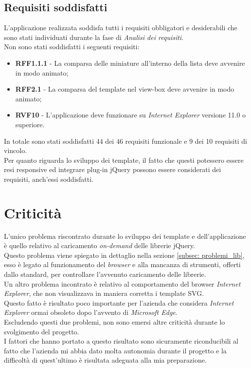 \subsection{Requisiti soddisfatti}
L'applicazione realizzata soddisfa tutti i requisiti obbligatori e desiderabili che sono stati individuati durante la fase di \textit{Analisi dei requisiti}.\\
Non sono stati soddisfatti i seguenti requisiti:
\begin{itemize}
	\item \textbf{RFF1.1.1} - La comparsa delle miniature all'interno della lista deve avvenire in modo animato;
	\item \textbf{RFF2.1} - La comparsa del template nel view-box deve avvenire in modo animato;
	\item \textbf{RVF10} - L'applicazione deve funzionare su \textit{Internet Explorer} versione 11.0 o superiore.
\end{itemize}
In totale sono stati soddisfatti 44 dei 46 requisiti funzionale e 9 dei 10 requisiti di vincolo.\\
Per quanto riguarda lo sviluppo dei template, il fatto che questi potessero essere resi responsive ed integrare plug-in jQuery possono essere considerati dei requisiti, anch'essi soddisfatti.
\section{Criticità}
L'unico problema riscontrato durante lo sviluppo dei template e dell'applicazione è quello relativo al caricamento \textit{on-demand} delle librerie jQuery.\\
Questo problema viene spiegato in dettaglio nella sezione \ref{subsec: problemi_lib}, esso è legato al funzionamento del \textit{browser} e alla mancanza di strumenti, offerti dallo standard, per controllare l'avvenuto caricamento delle librerie.\\
Un altro problema incontrato è relativo al comportamento del browser \textit{Internet Explorer}, che non visualizzava in maniera corretta i template SVG.\\
Questo fatto è risultato poco importante per l'azienda che considera \textit{Internet Explorer} ormai obsoleto dopo l'avvento di \textit{Microsoft Edge}.\\
Escludendo questi due problemi, non sono emersi altre criticità durante lo svolgimento del progetto.\\
I fattori che hanno portato a questo risultato sono sicuramente riconducibili al fatto che l'azienda mi abbia dato molta autonomia durante il progetto e la difficoltà di quest'ultimo è risultata adeguata alla mia preparazione.
 
